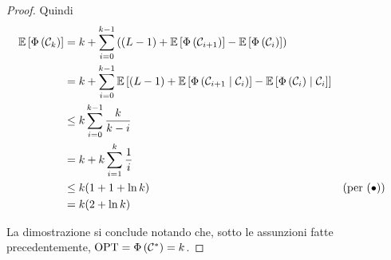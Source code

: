 \begin{proof}
    Quindi
    \begin{align*}
        \mathbb{E} \left[\Phi \left(\mathcal{C}_k\right)\right] & = k + \sum_{i = 0}^{k-1} \left(\left(L - 1\right) + \mathbb{E} \left[\Phi \left(\mathcal{C}_{i+1}\right)\right] - \mathbb{E} \left[\Phi \left(\mathcal{C}_i \right)\right]\right) \\
        & = k + \sum_{i = 0}^{k-1} \mathbb{E} \left[\left(L - 1\right) + \mathbb{E} \left[\Phi \left(\mathcal{C}_{i+1} \mid \mathcal{C}_i\right)\right] - \mathbb{E} \left[ \Phi \left(\mathcal{C}_i\right) \mid \mathcal{C}_i \right]\right] \\
        & \leq k \sum_{i = 0}^{k-1} \frac{k}{k-i} \\
        & = k + k \sum_{i = 1}^k \frac{1}{i} \\
        & \leq k (1 + 1 + \ln k) && (\text{per } (\bullet)) \\
        & = k (2 + \ln k)
    \end{align*}

    La dimostrazione si conclude notando che, sotto le assunzioni fatte precedentemente, $\textnormal{OPT} = \Phi \left(\mathcal{C}^\ast \right) = k$.
\end{proof}


